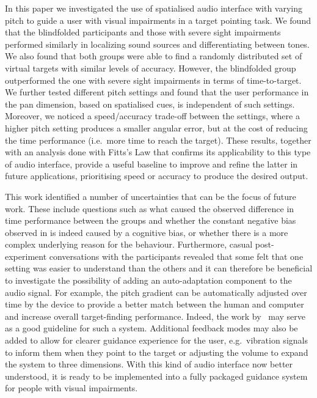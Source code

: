 \documentclass[acmsmall]{acmart}
\begin{document}
In this paper we investigated the use of spatialised audio interface with varying pitch to guide a user with visual impairments in a target pointing task.
We found that the blindfolded participants and those with severe sight impairments performed similarly in localizing sound sources and differentiating between tones. 
We also found that both groups were able to find a randomly distributed set of virtual targets with similar levels of accuracy.
However, the blindfolded group outperformed the one with severe sight impairments in terms of time-to-target. 
We further tested different pitch settings and found that the user performance in the pan dimension, based on spatialised cues, is independent of such settings.
Moreover, we noticed a speed/accuracy trade-off between the settings, where a higher pitch setting produces a smaller angular error, but at the cost of reducing the time performance (i.e.\ more time to reach the target). 
These results, together with an analysis done with Fitts's Law that confirms its applicability to this type of audio interface, provide a useful baseline to improve and refine the latter in future applications, prioritising speed or accuracy to produce the desired output.

This work identified a number of uncertainties that can be the focus of future work.
These include questions such as what caused the observed difference in time performance between the groups and whether the constant negative bias observed in  is indeed caused by a cognitive bias, or whether there is a more complex underlying reason for the behaviour.
Furthermore, casual post-experiment conversations with the participants revealed that some felt that one setting was easier to understand than the others and it can therefore be beneficial to investigate the possibility of adding an auto-adaptation component to the audio signal.
For example, the pitch gradient can be automatically adjusted over time by the device to provide a better match between the human and computer and increase overall target-finding performance.
Indeed, the work by~\cite{gallina2015progressive} may serve as a good guideline for such a system.
Additional feedback modes may also be added to allow for clearer guidance experience for the user, e.g.\ vibration signals to inform them when they point to the target or adjusting the volume to expand the system to three dimensions.
With this kind of audio interface now better understood, it is ready to be implemented into a fully packaged guidance system for people with visual impairments.



\end{document}
